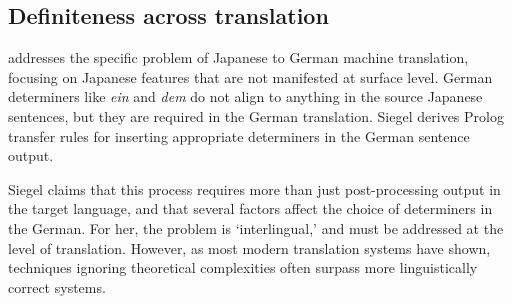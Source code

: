 \documentclass[11pt]{article}
\begin{document}
\subsection{Definiteness across translation}

\citet{siegel:1996} addresses the specific problem of Japanese to German machine translation, focusing on Japanese features that are not manifested at surface level.
German determiners like \emph{ein} and \emph{dem} do not align to anything in the source Japanese sentences, but they are required in the German translation. Siegel derives Prolog transfer rules for inserting appropriate determiners in the German sentence output.

Siegel claims that this process requires more than just post-processing output in the target language, and that several factors affect the choice of determiners in the German. For her, the problem is `interlingual,' and must be addressed at the level of translation.
However, as most modern translation systems have shown, techniques ignoring theoretical complexities often surpass more linguistically correct systems.
\end{document}
